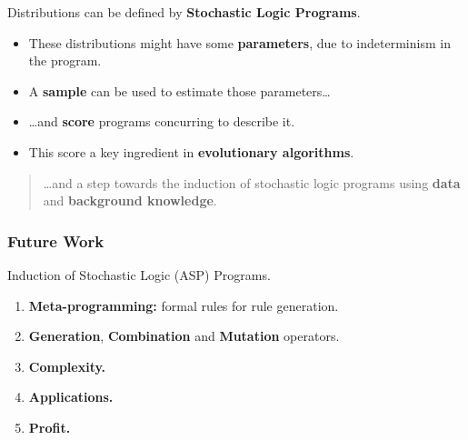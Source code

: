 \documentclass[bigger,xcolor={x11names,svgnames}]{beamer}
\begin{document}
%
\begin{frame}
    Distributions can be defined by \textbf{Stochastic Logic Programs}.
    \begin{itemize}
        \item These distributions might have some \textbf{parameters}, due to indeterminism in the program.
        \item A \textbf{sample} can be used to estimate those parameters\ldots
        \item \ldots and \textbf{score} programs concurring to describe it.
        \item This score a key ingredient in \textbf{evolutionary algorithms}.
    \end{itemize}
    \begin{quotation}
        \ldots and a step towards the \alert{induction of stochastic logic programs} using \textbf{data} and \textbf{background knowledge}.
    \end{quotation}
\end{frame}
%
\begin{frame}
    \frametitle{Future Work}
    \vfill
    \begin{center}
        Induction of Stochastic Logic (ASP) Programs.
    \end{center}
    \vfill
    \begin{enumerate}
        \item \textbf{Meta-programming:} formal rules for rule generation.
        \item \textbf{Generation}, \textbf{Combination} and \textbf{Mutation} operators.
        \item \textbf{Complexity.}
        \item \textbf{Applications.}
        \item \textbf{Profit.}
    \end{enumerate}
    \vfill
\end{frame}
%
\end{document}
